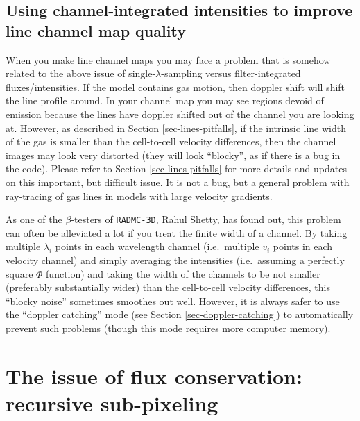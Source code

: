 \documentclass{report}
\begin{document}
\subsection{Using channel-integrated intensities to improve line channel map quality}
\label{sec-wavelength-bands-subsec}
%
When you make line channel maps you may face a problem that is somehow
related to the above issue of single-$\lambda$-sampling versus
filter-integrated fluxes/intensities. If the model contains gas motion, then
doppler shift will shift the line profile around. In your channel map you
may see regions devoid of emission because the lines have doppler shifted
out of the channel you are looking at. However, as described in Section
\ref{sec-lines-pitfalls}, if the intrinsic line width of the gas is smaller
than the cell-to-cell velocity differences, then the channel images may look
very distorted (they will look ``blocky'', as if there is a bug in the
code). Please refer to Section \ref{sec-lines-pitfalls} for more details and
updates on this important, but difficult issue. It is not a bug, but a
general problem with ray-tracing of gas lines in models with large velocity
gradients. 

As one of the $\beta$-testers of {\small\tt RADMC-3D}, Rahul Shetty, has
found out, this problem can often be alleviated a lot if you treat the
finite width of a channel. By taking multiple $\lambda_i$ points in each
wavelength channel (i.e.~multiple $v_i$ points in each velocity channel) and
simply averaging the intensities (i.e.\ assuming a perfectly square $\Phi$
function) and taking the width of the channels to be not smaller (preferably
substantially wider) than the cell-to-cell velocity differences, this
``blocky noise'' sometimes smoothes out well. However, it is always safer to
use the ``doppler catching'' mode (see Section \ref{sec-doppler-catching})
to automatically prevent such problems (though this mode requires more
computer memory). 



\section{The issue of flux conservation: recursive sub-pixeling}
\label{sec-image-refinement}
%
\end{document}
